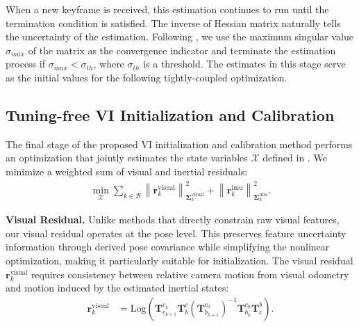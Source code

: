 When a new keyframe is received, this estimation continues to run until the termination condition is satisfied. The inverse of Hessian matrix naturally tells the uncertainty of the estimation. Following \cite{shen-init}, we use the maximum singular value $\sigma_{max}$ of the matrix as the convergence indicator and terminate the estimation process if $\sigma_{max} < \sigma_{th}$, where $\sigma_{th}$ is a threshold. The estimates in this stage serve as the initial values for the following tightly-coupled optimization.


\subsection{Tuning-free VI Initialization and Calibration}
\label{sec:maci2:optimization}

The final stage of the proposed VI initialization and calibration method performs an optimization that jointly estimates the state variables $\mathcal {X}$ defined in . We minimize a weighted sum of visual and inertial residuals:
\begin{equation}
\label{eq:maci2:tight_optimize}
\begin{aligned}
    \min_{\mathcal {X}} \sum_{k \in \mathcal{B}} \left\| \mathbf{r}^{\text{visual}}_k \right\|^2_{\bm{\Sigma}^{\text{visual}}_k} + \left\| \mathbf{r}^{\text{imu}}_k \right\|^2_{\bm{\Sigma}^{\text{imu}}_k}.
\end{aligned}
\end{equation}

\noindent \textbf{Visual Residual.} Unlike methods that directly constrain raw visual features, our visual residual operates at the pose level. This preserves feature uncertainty information through derived pose covariance while simplifying the nonlinear optimization, making it particularly suitable for initialization. The visual residual $\mathbf{r}^{\text{visual}}_k$ requires consistency between relative camera motion from visual odometry and motion induced by the estimated inertial states:
\begin{equation}
\begin{aligned}
\mathbf{r}^{\text{visual}}_k &= 
\text{Log}(\mathbf{T}^{c_k}_{c_{k+1}} \mathbf{T}^c_b (\mathbf{T}^{c_0}_{b_{k+1}})^{-1}\mathbf{T}^{c_0}_{b_k}\mathbf{T}^b_c).
\end{aligned}
\end{equation}

